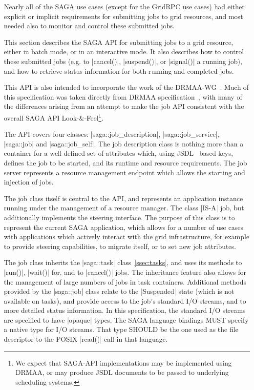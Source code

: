  
  Nearly all of the SAGA use cases (except for the GridRPC use
  cases) had either explicit or implicit requirements for
  submitting jobs to grid resources, and most needed 
  also to monitor and control these submitted jobs.
 
  This section describes the SAGA API for submitting jobs to a
  grid resource, either in batch mode, or in an interactive
  mode. It also describes how to control these submitted jobs
  (e.g.  to |cancel()|, |suspend()|, or |signal()| a running
  job), and how to retrieve status information for both running
  and completed jobs.
  
  This API is also intended to incorporate the work of the
  DRMAA-WG~\cite{drmaa-wg}.  Much of this specification was
  taken directly from DRMAA specification~\cite{drmaa-spec},
  with many of the differences arising from an attempt to make
  the job API consistent with the overall SAGA API
  Look-\&-Feel\footnote{We expect that SAGA-API
  implementations may be implemented using DRMAA, or may produce
  JSDL documents to be passed to underlying scheduling
  systems.}.
  
  The API covers four classes: |saga::job_description|,
  |saga::job_service|, |saga::job| and |saga::job_self|.  The
  job description class is nothing more than a container for
  a well defined set of attributes which, using
  JSDL~\cite{jsdl-wg} based keys, defines the job to be started,
  and its runtime and resource requirements.  The job
  server represents a resource management endpoint which allows
  the starting and injection of jobs. 
  
  The job class itself is central to the API, and represents an
  application instance running under the management of
  a resource manager.  The  class |IS-A| job, but
  additionally implements the steering interface.  The purpose
  of this class is to represent the current SAGA application,
  which allows for a number of use cases with
  applications which actively interact with the grid
  infrastructure, for example to provide steering capabilities,
  to migrate itself, or to set new job attributes.
  
  The job class inherits the |saga::task|
  class~\ref{ssec:tasks}, and uses its methods to |run()|,
  |wait()| for, and to |cancel()| jobs.  The inheritance feature
  also allows for the management of large numbers of jobs in
  task containers.  Additional methods provided by the
  |saga::job| class relate to the |Suspended| state (which is
  not available on tasks), and provide access to the job's
  standard I/O streams, and to more detailed status information.
  In this specification, the standard I/O streams are specified
  to have |opaque| types.  The SAGA language bindings MUST
  specify a native type for I/O streams.  That type SHOULD be
  the one used as the file descriptor to the POSIX |read()| call
  in that language.
 
